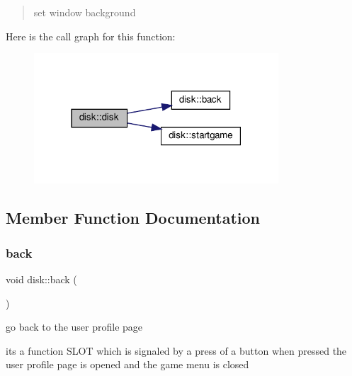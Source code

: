 \begin{quote}
set window background \end{quote}
Here is the call graph for this function\+:
\nopagebreak
\begin{figure}[H]
\begin{center}
\leavevmode
\includegraphics[width=259pt]{classdisk_ae8d9b531677cf773fcddef292b9317f0_cgraph}
\end{center}
\end{figure}


\subsection{Member Function Documentation}
\mbox{\label{classdisk_a9bff15b70a60d9264183141046d172ed}} 
\subsubsection{\texorpdfstring{back}{back}}
{\footnotesize\ttfamily void disk\+::back (\begin{DoxyParamCaption}{ }\end{DoxyParamCaption})\hspace{0.3cm}{\ttfamily [slot]}}



go back to the user profile page 

its a function S\+L\+OT which is signaled by a press of a button when pressed the user profile page is opened and the game menu is closed


